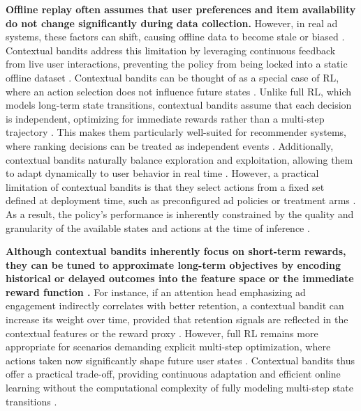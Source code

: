 \documentclass[final]{anthology-ch}         %
\begin{document}
\textbf{Offline replay  often assumes that user preferences and item availability do not change significantly during data collection. }However, in real ad systems, these factors can shift, causing offline data to become stale or biased \cite{levine2020offline} \cite{agarwal2014taming}. Contextual bandits address this limitation by leveraging continuous feedback from live user interactions, preventing the policy from being locked into a static offline dataset \cite{li2010contextual}. Contextual bandits can be thought of as a special case of RL, where an action selection does not influence future states \cite{bubeck2012regret} \cite{Sutton1998}. Unlike full RL, which models long-term state transitions, contextual bandits assume that each decision is independent, optimizing for immediate rewards rather than a multi-step trajectory \cite{bubeck2012regret} \cite{Sutton1998}. This makes them particularly well-suited for recommender systems, where ranking decisions can be treated as independent events \cite{afsar2022reinforcement} \cite{zhou2016latent}. Additionally, contextual bandits naturally balance exploration and exploitation, allowing them to adapt dynamically to user behavior in real time \cite{li2010contextual}. However, a practical limitation of contextual bandits is that they select actions from a fixed set defined at deployment time, such as preconfigured ad policies or treatment arms \cite{bietti2021contextual}. As a result, the policy’s performance is inherently constrained by the quality and granularity of the available states and actions at the time of inference \cite{dimitrakakis2018decision}.

\textbf{Although contextual bandits inherently focus on short-term rewards, they can be tuned to approximate long-term objectives by encoding historical or delayed outcomes into the feature space or the immediate reward function \cite{mcdonald2023impatient} \cite{wu2017returning}.} For instance, if an attention head emphasizing ad engagement indirectly correlates with better retention, a contextual bandit can increase its weight over time, provided that retention signals are reflected in the contextual features or the reward proxy \cite{yi2023progressive}. However, full RL remains more appropriate for scenarios demanding explicit multi-step optimization, where actions taken now significantly shape future user states \cite{gauci2018horizon}. Contextual bandits thus offer a practical trade-off, providing continuous adaptation and efficient online learning without the computational complexity of fully modeling multi-step state transitions \cite{gauci2018horizon} \cite{levine2020offline}.
\end{document}

